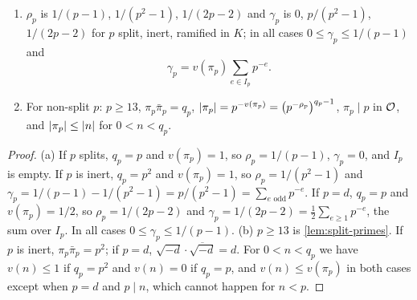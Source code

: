 \begin{lemma}\label{lem:prime-notation}
\begin{enumerate}[label=\textup{(\alph*)}]
\item $\rho_p$ is $1/(p-1)$, $1/(p^2-1)$, $1/(2p-2)$ and $\gamma_p$ is $0$, $p/(p^2-1)$, $1/(2p-2)$ for
$p$ split, inert, ramified in $K$; in all cases $0\le\gamma_p\le1/(p-1)$ and
\[
  \gamma_p=v(\pi_p)\sum_{e\in I_p}p^{-e}.
\]
\item For non-split $p$: $p\ge13$, $\pi_p\bar\pi_p=q_p$, $\lvert \pi_p\rvert=p^{-v(\pi_p)}=
\bigl(p^{-\rho_p}\bigr)^{q_p-1}$, $\pi_p\mid p$ in $\mathcal{O}$, and $\lvert \pi_p\rvert\le\lvert n\rvert$ for $0<n<q_p$.
\end{enumerate}
\end{lemma}

\begin{proof}
(a) If $p$ splits, $q_p=p$ and $v(\pi_p)=1$, so $\rho_p=1/(p-1)$, $\gamma_p=0$, and $I_p$ is empty. If $p$ is inert, $q_p=p^2$ and $v(\pi_p)=1$, so $\rho_p=1/(p^2-1)$ and $\gamma_p=1/(p-1)-1/(p^2-1)=p/(p^2-1)=\sum_{e\text{ odd}}p^{-e}$. If $p=d$, $q_p=p$ and $v(\pi_p)=1/2$, so $\rho_p=1/(2p-2)$ and $\gamma_p=1/(2p-2)=\frac12\sum_{e\ge1}p^{-e}$, the sum over $I_p$. In all cases $0\le\gamma_p\le1/(p-1)$.
 (b) $p\ge13$ is \cref{lem:split-primes}. If $p$ is inert, $\pi_p\bar\pi_p=p^2$; if $p=d$,
$\sqrt{-d}\cdot\overline{\sqrt{-d}}=d$. For $0<n<q_p$ we have $v(n)\le1$ if $q_p=p^2$ and $v(n)=0$ if
$q_p=p$, and $v(n)\le v(\pi_p)$ in both cases except when $p=d$ and $p\mid n$, which cannot happen for
$n<p$.
\end{proof}

